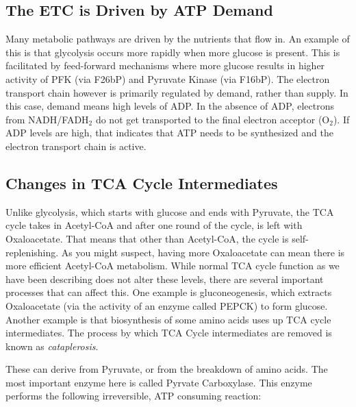 \documentclass{tufte-handout}
\begin{document}
\subsection{The ETC is Driven by ATP Demand}

Many metabolic pathways are driven by the nutrients that flow in.  An example of this is that glycolysis occurs more rapidly when more glucose is present.  This is facilitated by feed-forward mechanisms where more glucose results in higher activity of PFK (via F26bP) and Pyruvate Kinase (via F16bP).  The electron transport chain however is primarily regulated by demand, rather than supply.  In this case, demand means high levels of ADP.  In the absence of ADP, electrons from NADH/FADH$_2$ do not get transported to the final electron acceptor (O$_2$).  If ADP levels are high, that indicates that ATP needs to be synthesized and the electron transport chain is active.  

\subsection{Changes in TCA Cycle Intermediates}

  Unlike glycolysis, which starts with glucose and ends with Pyruvate, the TCA cycle takes in Acetyl-CoA and after one round of the cycle, is left with Oxaloacetate.  That means that other than Acetyl-CoA, the cycle is self-replenishing.  As you might suspect, having more Oxaloacetate can mean there is more efficient Acetyl-CoA metabolism.  While normal TCA cycle function as we have been describing does not alter these levels, there are several important processes that can affect this.  One example is gluconeogenesis, which extracts Oxaloacetate (via the activity of an enzyme called PEPCK) to form glucose.  Another example is that biosynthesis of some amino acids uses up TCA cycle intermediates.  The process by which TCA Cycle intermediates are removed is known as \emph{cataplerosis}.

  These can derive from Pyruvate, or from the breakdown of amino acids.  The most important enzyme here is called Pyrvate Carboxylase.  This enzyme performs the following irreversible, ATP consuming reaction:
\end{document}
